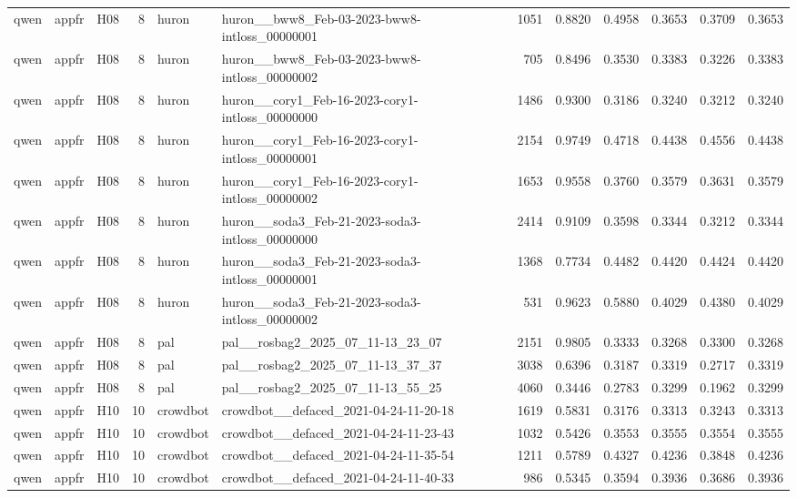 \begin{table}[tbp]
\begin{tabular}{lllrllrrrrrr}
qwen & appfr & H08 & 8 & huron & huron\_\_bww8\_Feb-03-2023-bww8-intloss\_00000001 & 1051 & 0.8820 & 0.4958 & 0.3653 & 0.3709 & 0.3653 \\
qwen & appfr & H08 & 8 & huron & huron\_\_bww8\_Feb-03-2023-bww8-intloss\_00000002 & 705 & 0.8496 & 0.3530 & 0.3383 & 0.3226 & 0.3383 \\
qwen & appfr & H08 & 8 & huron & huron\_\_cory1\_Feb-16-2023-cory1-intloss\_00000000 & 1486 & 0.9300 & 0.3186 & 0.3240 & 0.3212 & 0.3240 \\
qwen & appfr & H08 & 8 & huron & huron\_\_cory1\_Feb-16-2023-cory1-intloss\_00000001 & 2154 & 0.9749 & 0.4718 & 0.4438 & 0.4556 & 0.4438 \\
qwen & appfr & H08 & 8 & huron & huron\_\_cory1\_Feb-16-2023-cory1-intloss\_00000002 & 1653 & 0.9558 & 0.3760 & 0.3579 & 0.3631 & 0.3579 \\
qwen & appfr & H08 & 8 & huron & huron\_\_soda3\_Feb-21-2023-soda3-intloss\_00000000 & 2414 & 0.9109 & 0.3598 & 0.3344 & 0.3212 & 0.3344 \\
qwen & appfr & H08 & 8 & huron & huron\_\_soda3\_Feb-21-2023-soda3-intloss\_00000001 & 1368 & 0.7734 & 0.4482 & 0.4420 & 0.4424 & 0.4420 \\
qwen & appfr & H08 & 8 & huron & huron\_\_soda3\_Feb-21-2023-soda3-intloss\_00000002 & 531 & 0.9623 & 0.5880 & 0.4029 & 0.4380 & 0.4029 \\
qwen & appfr & H08 & 8 & pal & pal\_\_rosbag2\_2025\_07\_11-13\_23\_07 & 2151 & 0.9805 & 0.3333 & 0.3268 & 0.3300 & 0.3268 \\
qwen & appfr & H08 & 8 & pal & pal\_\_rosbag2\_2025\_07\_11-13\_37\_37 & 3038 & 0.6396 & 0.3187 & 0.3319 & 0.2717 & 0.3319 \\
qwen & appfr & H08 & 8 & pal & pal\_\_rosbag2\_2025\_07\_11-13\_55\_25 & 4060 & 0.3446 & 0.2783 & 0.3299 & 0.1962 & 0.3299 \\
qwen & appfr & H10 & 10 & crowdbot & crowdbot\_\_defaced\_2021-04-24-11-20-18 & 1619 & 0.5831 & 0.3176 & 0.3313 & 0.3243 & 0.3313 \\
qwen & appfr & H10 & 10 & crowdbot & crowdbot\_\_defaced\_2021-04-24-11-23-43 & 1032 & 0.5426 & 0.3553 & 0.3555 & 0.3554 & 0.3555 \\
qwen & appfr & H10 & 10 & crowdbot & crowdbot\_\_defaced\_2021-04-24-11-35-54 & 1211 & 0.5789 & 0.4327 & 0.4236 & 0.3848 & 0.4236 \\
qwen & appfr & H10 & 10 & crowdbot & crowdbot\_\_defaced\_2021-04-24-11-40-33 & 986 & 0.5345 & 0.3594 & 0.3936 & 0.3686 & 0.3936 \\

\end{tabular}
\end{table}
